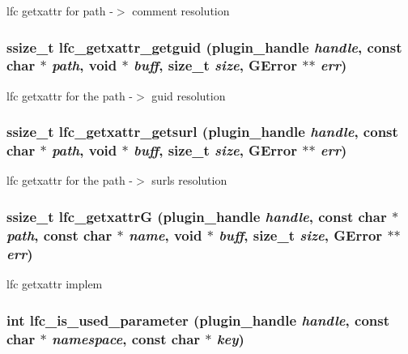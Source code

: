 lfc getxattr for path -$>$ comment resolution 
\subsubsection{\setlength{\rightskip}{0pt plus 5cm}ssize\_\-t lfc\_\-getxattr\_\-getguid (plugin\_\-handle {\em handle}, const char $\ast$ {\em path}, void $\ast$ {\em buff}, size\_\-t {\em size}, GError $\ast$$\ast$ {\em err})}\label{gfal__common__lfc_8c_264e0ecec42fb618c37740ccbf38e427}


lfc getxattr for the path -$>$ guid resolution 
\subsubsection{\setlength{\rightskip}{0pt plus 5cm}ssize\_\-t lfc\_\-getxattr\_\-getsurl (plugin\_\-handle {\em handle}, const char $\ast$ {\em path}, void $\ast$ {\em buff}, size\_\-t {\em size}, GError $\ast$$\ast$ {\em err})}\label{gfal__common__lfc_8c_65c91b05b7dea8642374bc4e3e477c19}


lfc getxattr for the path -$>$ surls resolution 
\subsubsection{\setlength{\rightskip}{0pt plus 5cm}ssize\_\-t lfc\_\-getxattr\-G (plugin\_\-handle {\em handle}, const char $\ast$ {\em path}, const char $\ast$ {\em name}, void $\ast$ {\em buff}, size\_\-t {\em size}, GError $\ast$$\ast$ {\em err})}\label{gfal__common__lfc_8c_81a95ba12afada4ce138ed309508f889}


lfc getxattr implem 
\subsubsection{\setlength{\rightskip}{0pt plus 5cm}int lfc\_\-is\_\-used\_\-parameter (plugin\_\-handle {\em handle}, const char $\ast$ {\em namespace}, const char $\ast$ {\em key})}\label{gfal__common__lfc_8c_f669f5bc357dba43cc9bf452d5cebf1c}


